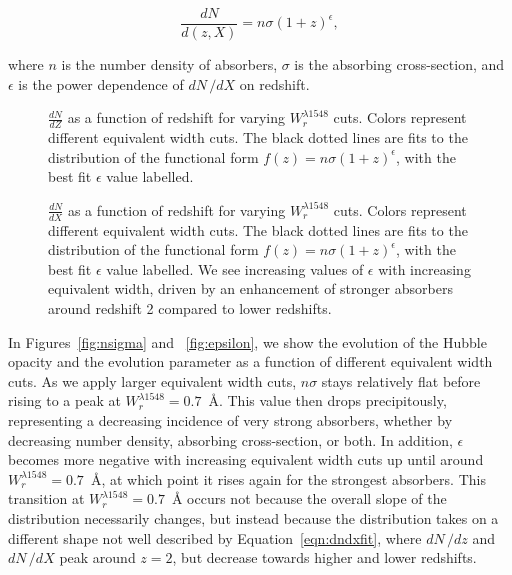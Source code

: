 \documentclass[linenumbers,twocolumn]{aastex61}
\begin{document}
\begin{equation}
\frac{dN}{d(z,X)} = n\sigma (1 + z)^{\epsilon},
\label{eqn:dndxfit}
\end{equation}

where $n$ is the number density of {\CIV} absorbers, $\sigma$ is the absorbing cross-section, and $\epsilon$ is the power dependence of $dN\,/dX$ on redshift.

\begin{figure}[bth]
\caption{$\frac{dN}{dZ}$ as a function of redshift for varying $W_r^{\lambda1548}$ cuts. Colors represent different equivalent width cuts. The black dotted lines are fits to the distribution of the functional form $f(z) = n\sigma (1 + z)^{\epsilon}$, with the best fit $\epsilon$ value labelled.}
\label{fig:dndz_cuts}
\end{figure}

\begin{figure}[bth]
\caption{$\frac{dN}{dX}$ as a function of redshift for varying $W_r^{\lambda1548}$ cuts. Colors represent different equivalent width cuts. The black dotted lines are fits to the distribution of the functional form $f(z) = n\sigma (1 + z)^{\epsilon}$, with the best fit $\epsilon$ value labelled. We see increasing values of $\epsilon$ with increasing equivalent width, driven by an enhancement of stronger {\CIV} absorbers around redshift 2 compared to lower redshifts.}
\label{fig:dndx_cuts}
\end{figure}

In Figures~\ref{fig:nsigma} and ~\ref{fig:epsilon}, we show the evolution of the Hubble opacity and the evolution parameter as a function of different equivalent width cuts. As we apply larger equivalent width cuts, $n\sigma$ stays relatively flat before rising to a peak at $W_r^{\lambda1548} = 0.7$~{\AA}. This value then drops precipitously, representing a decreasing incidence of very strong {\CIV} absorbers, whether by decreasing number density, absorbing cross-section, or both. In addition, $\epsilon$ becomes more negative with increasing equivalent width cuts up until around $W_r^{\lambda1548} = 0.7$~{\AA}, at which point it rises again for the strongest {\CIV} absorbers. This transition at $W_r^{\lambda1548} = 0.7$~{\AA} occurs not because the overall slope of the distribution necessarily changes, but instead because the distribution takes on a different shape not well described by Equation~\ref{eqn:dndxfit}, where $dN\,/dz$ and $dN\,/dX$ peak around $z = 2$, but decrease towards higher and lower redshifts.
\end{document}
